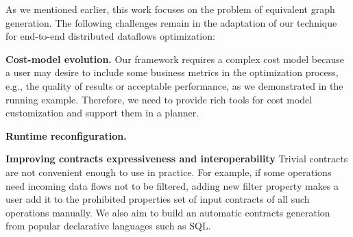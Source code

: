 As we mentioned earlier, this work focuses on the problem of equivalent graph generation. The following challenges remain in the adaptation of our technique for end-to-end distributed dataflows optimization:

\textbf{Cost-model evolution.}
Our framework requires a complex cost model because a user may desire to include some business metrics in the optimization process, e.g., the quality of results or acceptable performance, as we demonstrated in the running example. Therefore, we need to provide rich tools for cost model customization and support them in a planner. 

\textbf{Runtime reconfiguration.}


\textbf{Improving contracts expressiveness and interoperability}
Trivial contracts are not convenient enough to use in practice.
For example, if some operations need incoming data flows not to be filtered, adding new filter property makes a user add it to the prohibited properties set of input contracts of all such operations manually. We also aim to build an automatic contracts generation from popular declarative languages such as SQL.









